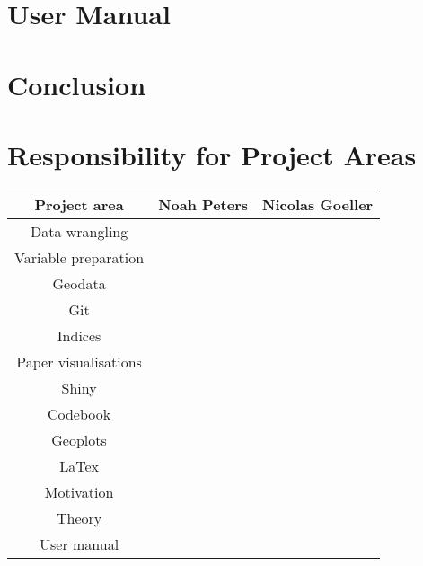 \documentclass[preprint,12pt,authoryear]{elsarticle}
\begin{document}
\section{User Manual}
	
\section{Conclusion}
	
\newpage
 \appendix
	
\section{Responsibility for Project Areas}

\begin{tabular}{|c|c|c|}
	\hline 
	\textbf{Project area}	& \textbf{Noah Peters} 	& \textbf{Nicolas Goeller} 	\\ 
	\hline 
	Data wrangling			&  		   				&  				 			\\ 
	\hline 
	Variable preparation 	&  		   				&  				 			\\ 
	\hline 
	Geodata					&  		   				&  				 			\\ 
	\hline 
	Git	     			 	&  		   				&  				 			\\ 
	\hline 			
	Indices				 	&  		   				&  				 			\\ 
	\hline 
	Paper visualisations 	&  		   				&  				 			\\ 
	\hline 
	Shiny 				 	&  		   				&  				 			\\ 
	\hline 
	Codebook 			 	&  		   				&  				 			\\ 
	\hline 
	Geoplots 			 	&  		   				&  				 			\\ 
	\hline 
	LaTex				 	&  		   				&  				 			\\ 
	\hline 
	Motivation			 	&  		   				&  				 			\\ 
	\hline 
	Theory				 	&  		   				&  				 			\\ 
	\hline 
	User manual			 	&  		   				&  				 			\\ 
	\hline 
\end{tabular}

 
	\newpage
	 
	
	
	
\end{document}
